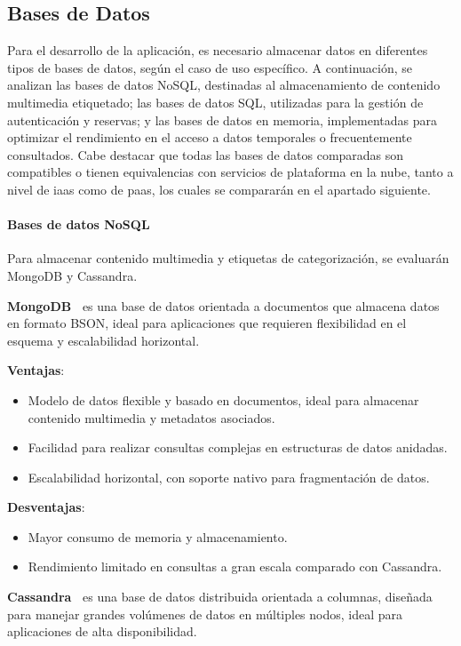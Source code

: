 \subsection{Bases de Datos}

Para el desarrollo de la aplicación, es necesario almacenar datos en diferentes tipos de bases de datos, según el caso de uso específico. A continuación, se analizan las bases de datos NoSQL, destinadas al almacenamiento de contenido multimedia etiquetado; las bases de datos SQL, utilizadas para la gestión de autenticación y reservas; y las bases de datos en memoria, implementadas para optimizar el rendimiento en el acceso a datos temporales o frecuentemente consultados. Cabe destacar que todas las bases de datos comparadas son compatibles o tienen equivalencias con servicios de plataforma en la nube, tanto a nivel de \gls{iaas} como de \gls{paas}, los cuales se compararán en el apartado siguiente.

\paragraph{Bases de datos NoSQL}
Para almacenar contenido multimedia y etiquetas de categorización, se evaluarán MongoDB y Cassandra.

\textbf{MongoDB~\cite{mongodb}} es una base de datos orientada a documentos que almacena datos en formato BSON, ideal para aplicaciones que requieren flexibilidad en el esquema y escalabilidad horizontal.

\textbf{Ventajas}:
\begin{itemize}
\item Modelo de datos flexible y basado en documentos, ideal para almacenar contenido multimedia y metadatos asociados.
\item Facilidad para realizar consultas complejas en estructuras de datos anidadas.
\item Escalabilidad horizontal, con soporte nativo para fragmentación de datos.
\end{itemize}

\textbf{Desventajas}:
\begin{itemize}
\item Mayor consumo de memoria y almacenamiento.
\item Rendimiento limitado en consultas a gran escala comparado con Cassandra.
\end{itemize}

\textbf{Cassandra~\cite{cassandra}} es una base de datos distribuida orientada a columnas, diseñada para manejar grandes volúmenes de datos en múltiples nodos, ideal para aplicaciones de alta disponibilidad.

